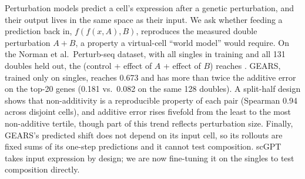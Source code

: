 Perturbation models predict a cell's expression after a genetic perturbation, and their
output lives in the same space as their input. We ask whether feeding a prediction back in,
$f(f(x, A), B)$, reproduces the measured double perturbation $A{+}B$, a property a
virtual-cell ``world model'' would require. On the Norman et al.\ Perturb-seq dataset, with
all singles in training and all 131 doubles held out, the \addnull (control + effect of $A$
+ effect of $B$) reaches . GEARS, trained only on singles, reaches 0.673 and has
more than twice the additive error on the top-20 genes (0.181 vs.\ 0.082 on the same 128 doubles). A split-half
design shows that non-additivity is a reproducible property of each pair (Spearman 0.94
across disjoint cells), and additive error rises fivefold from the least to the most non-additive tertile, though part of this trend reflects perturbation size. Finally, GEARS's predicted shift does not depend on its input cell, so
its rollouts are fixed sums of its one-step predictions and it cannot test composition. scGPT takes input
expression by design; we are now fine-tuning it on the singles to test composition directly.
